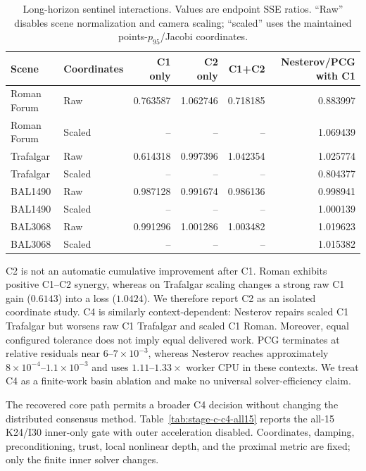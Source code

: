 \begin{table}[t]
  \centering
  \caption{Long-horizon sentinel interactions.  Values are endpoint SSE ratios.
  ``Raw'' disables scene normalization and camera scaling; ``scaled'' uses the
  maintained points-$p_{95}$/Jacobi coordinates.}
  \label{tab:stage-c-factorials}
  \small
  \begin{tabular}{llrrrr}
    \hline
    Scene & Coordinates & C1 only & C2 only & C1+C2 & Nesterov/PCG with C1 \\
    \hline
    Roman Forum & Raw & 0.763587 & 1.062746 & 0.718185 & 0.883997 \\
    Roman Forum & Scaled & -- & -- & -- & 1.069439 \\
    Trafalgar & Raw & 0.614318 & 0.997396 & 1.042354 & 1.025774 \\
    Trafalgar & Scaled & -- & -- & -- & 0.804377 \\
    BAL1490 & Raw & 0.987128 & 0.991674 & 0.986136 & 0.998941 \\
    BAL1490 & Scaled & -- & -- & -- & 1.000139 \\
    BAL3068 & Raw & 0.991296 & 1.001286 & 1.003482 & 1.019623 \\
    BAL3068 & Scaled & -- & -- & -- & 1.015382 \\
    \hline
  \end{tabular}
\end{table}

C2 is not an automatic cumulative improvement after C1.  Roman exhibits
positive C1--C2 synergy, whereas on Trafalgar scaling changes a strong raw C1
gain ($0.6143$) into a loss ($1.0424$).  We therefore report C2 as an isolated
coordinate study.  C4 is similarly context-dependent: Nesterov repairs scaled
C1 Trafalgar but worsens raw C1 Trafalgar and scaled C1 Roman.  Moreover, equal
configured tolerance does not imply equal delivered work.  PCG terminates at
relative residuals near $6\text{--}7\times10^{-3}$, whereas Nesterov reaches
approximately $8\times10^{-4}\text{--}1.1\times10^{-3}$ and uses
$1.11\text{--}1.33\times$ worker CPU in these contexts.  We treat C4 as a
finite-work basin ablation and make no universal solver-efficiency claim.

The recovered core path permits a broader C4 decision without changing the
distributed consensus method.  Table~\ref{tab:stage-c-c4-all15} reports the
all-15 K24/I30 inner-only gate with outer acceleration disabled.  Coordinates,
damping, preconditioning, trust, local nonlinear depth, and the proximal metric
are fixed; only the finite inner solver changes.

